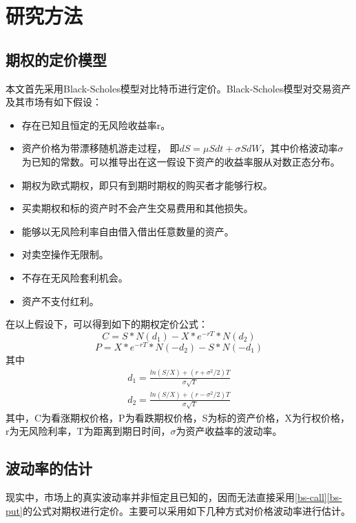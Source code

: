 \chapter{研究方法}
    \section{期权的定价模型}
    本文首先采用Black-Scholes模型对比特币进行定价。Black-Scholes模型对交易资产及其市场有如下假设：
    \begin{itemize}
        \item 存在已知且恒定的无风险收益率r。
        \item 资产价格为带漂移随机游走过程， 即$dS={\mu}Sdt+{\sigma}SdW$，其中价格波动率$\sigma$为已知的常数。可以推导出在这一假设下资产的收益率服从对数正态分布。
        \item 期权为欧式期权，即只有到期时期权的购买者才能够行权。
        \item 买卖期权和标的资产时不会产生交易费用和其他损失。
        \item 能够以无风险利率自由借入借出任意数量的资产。
        \item 对卖空操作无限制。
        \item 不存在无风险套利机会。
        \item 资产不支付红利。
    \end{itemize}
    在以上假设下，可以得到如下的期权定价公式：
    \begin{equation}\label{bs-call}
            C=S*N(d_1)-X*e^{-rT}*N(d_2) 
    \end{equation}
    \begin{equation}\label{bs-put}
        P=X*e^{-rT}*N(-d_2)-S*N(-d_1)
    \end{equation}
    其中
    \begin{equation*}
        \begin{split}
        d_1=\frac{ln(S/X)+(r+\sigma^2/2)T}{\sigma{\sqrt{T}}} \\
        d_2=\frac{ln(S/X)+(r-\sigma^2/2)T}{\sigma{\sqrt{T}}}
        \end{split}
    \end{equation*}
    其中，C为看涨期权价格，P为看跌期权价格，S为标的资产价格，X为行权价格，r为无风险利率，T为距离到期日时间，$\sigma$为资产收益率的波动率。
    
    \section{波动率的估计}
    现实中，市场上的真实波动率并非恒定且已知的，因而无法直接采用\ref{bs-call}\ref{bs-put}的公式对期权进行定价。主要可以采用如下几种方式对价格波动率进行估计。
